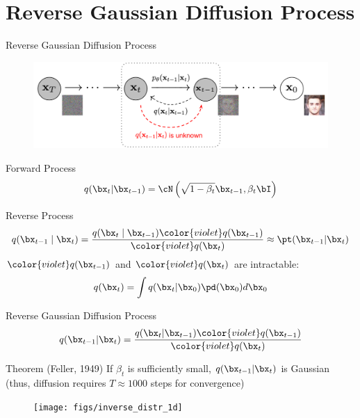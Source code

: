 \documentclass{beamer}
\begin{document}
\section{Reverse Gaussian Diffusion Process}
\begin{frame}{Reverse Gaussian Diffusion Process}
	\begin{figure}
		\includegraphics[width=0.8\linewidth]{figs/DDPM}
	\end{figure}
    \eqpause
	\vspace{-0.5cm}
	\begin{block}{Forward Process}
		\vspace{-0.3cm}
		\[
			q(\bx_t | \bx_{t-1}) = \cN\left(\sqrt{1 - \beta_t} \bx_{t-1}, \beta_t \bI\right)
		\]
		\vspace{-0.5cm}
	\end{block}
    \eqpause
	\begin{block}{Reverse Process}
		\vspace{-0.3cm}
		\[
			q(\bx_{t-1}\mid\bx_{t}) = \frac{q(\bx_{t}\mid\bx_{t-1}) {\color{violet}q(\bx_{t-1})}}{{\color{violet}q(\bx_{t})}} 
			\approx \pt(\bx_{t - 1} | \bx_t)
		\]
        \eqpause
		\vspace{-0.3cm}
		${\color{violet}q(\bx_{t-1})}$ and ${\color{violet}q(\bx_{t})}$ are intractable:
		\[
			q(\bx_{t}) = \int q(\bx_{t} | \bx_0) \pd(\bx_0) d\bx_0
		\]
	\end{block}
\end{frame}
\begin{frame}{Reverse Gaussian Diffusion Process}
	\vspace{-0.4cm}
	\[
		q(\bx_{t-1}|\bx_{t}) = \frac{q(\bx_{t}|\bx_{t-1}) {\color{violet}q(\bx_{t-1})}}{{\color{violet}q(\bx_{t})}} 
	\]
	\vspace{-0.4cm}
	\begin{block}{Theorem (Feller, 1949)}
		If $\beta_t$ is sufficiently small, $q(\bx_{t-1}|\bx_t)$ is Gaussian {\color{gray}(thus, diffusion requires $T \approx 1000$ steps for convergence)}
	\end{block}
	\eqpause
	\vspace{-0.3cm}
	\begin{figure}
		\texttt{[image: figs/inverse\_distr\_1d]}
	\end{figure}
\end{frame} 
\end{document}
